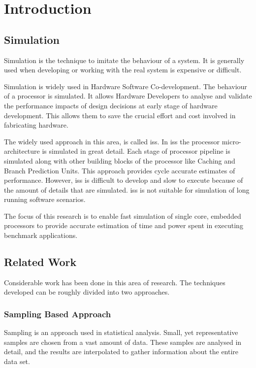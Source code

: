\chapter{Introduction}\label{chapter:introduction}

\section{Simulation}

Simulation is the technique to imitate the behaviour of a system. It is generally used when developing or working with the real system is expensive or difficult. 

Simulation is widely used in Hardware Software Co-development. The behaviour of a processor is simulated. It allows Hardware Developers to analyse and validate the performance impacts of design decisions at early stage of hardware development. This allows them to save the crucial effort and cost involved in fabricating hardware.

The widely used approach in this area, is called \gls{iss}. In \gls{iss} the processor micro-architecture is simulated in great detail. Each stage of processor pipeline is simulated along with other building blocks of the processor like Caching and Branch Prediction Units. This approach provides cycle accurate estimates of performance. However, \gls{iss} is difficult to develop and slow to execute because of the amount of details that are simulated. \gls{iss} is not suitable for simulation of long running software scenarios.

The focus of this research is to enable fast simulation of single core, embedded processors to provide accurate estimation of time and power spent in executing benchmark applications.

\section{Related Work}
Considerable work has been done in this area of research. The techniques developed can be roughly divided into two approaches. 

\subsection{Sampling Based Approach}
Sampling is an approach used in statistical analysis. Small, yet representative samples are chosen from a vast amount of data. These samples are analysed in detail, and the results are interpolated to gather information about the entire data set.

